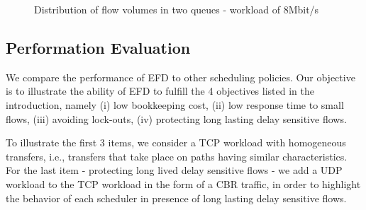 \documentclass[preprint,12pt]{elsarticle}
\begin{document}
\begin{figure}[ht]
  \centering
  \caption{Distribution of flow volumes in two queues - workload of 8Mbit/s}
  \label{fig:flow_dist}
\end{figure}

\subsection{Performation Evaluation}
We compare the performance of EFD to other scheduling policies. Our objective is to illustrate the ability of EFD to fulfill the 4 objectives listed in the introduction, namely (i) low bookkeeping cost, (ii) low response time to small flows, (iii) avoiding lock-outs, (iv) protecting long lasting delay sensitive flows.%

To illustrate the first 3 items, we consider a TCP workload with homogeneous transfers, i.e., transfers that take place on paths having similar characteristics. For the last item - protecting long lived delay sensitive flows - we add a UDP workload to the TCP workload in the form of a CBR traffic,  in order to highlight the behavior of each scheduler in presence of long lasting delay sensitive flows. %
\end{document}
